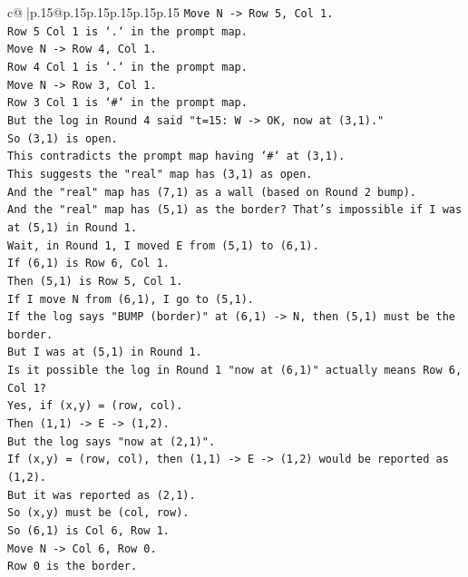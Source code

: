 \documentclass{article}
\begin{document}
{\begin{supertabular}{c@{$\;$}|p{.15\linewidth}@{}p{.15\linewidth}p{.15\linewidth}p{.15\linewidth}p{.15\linewidth}p{.15\linewidth}}
{{{\texttt{Move N {-}> Row 5, Col 1.} \\
\texttt{Row 5 Col 1 is `.` in the prompt map.} \\
\texttt{Move N {-}> Row 4, Col 1.} \\
\texttt{Row 4 Col 1 is `.` in the prompt map.} \\
\texttt{Move N {-}> Row 3, Col 1.} \\
\texttt{Row 3 Col 1 is `\#` in the prompt map.} \\
\texttt{But the log in Round 4 said "t=15: W {-}> OK, now at (3,1)."} \\
\texttt{So (3,1) is open.} \\
\texttt{This contradicts the prompt map having `\#` at (3,1).} \\
\texttt{This suggests the "real" map has (3,1) as open.} \\
\texttt{And the "real" map has (7,1) as a wall (based on Round 2 bump).} \\
\texttt{And the "real" map has (5,1) as the border? That's impossible if I was at (5,1) in Round 1.} \\
\texttt{Wait, in Round 1, I moved E from (5,1) to (6,1).} \\
\texttt{If (6,1) is Row 6, Col 1.} \\
\texttt{Then (5,1) is Row 5, Col 1.} \\
\texttt{If I move N from (6,1), I go to (5,1).} \\
\texttt{If the log says "BUMP (border)" at (6,1) {-}> N, then (5,1) must be the border.} \\
\texttt{But I was at (5,1) in Round 1.} \\
\texttt{Is it possible the log in Round 1 "now at (6,1)" actually means Row 6, Col 1?} \\
\texttt{Yes, if (x,y) = (row, col).} \\
\texttt{Then (1,1) {-}> E {-}> (1,2).} \\
\texttt{But the log says "now at (2,1)".} \\
\texttt{If (x,y) = (row, col), then (1,1) {-}> E {-}> (1,2) would be reported as (1,2).} \\
\texttt{But it was reported as (2,1).} \\
\texttt{So (x,y) must be (col, row).} \\
\texttt{So (6,1) is Col 6, Row 1.} \\
\texttt{Move N {-}> Col 6, Row 0.} \\
\texttt{Row 0 is the border.} \\
}}}
\end{supertabular}}
\end{document}
